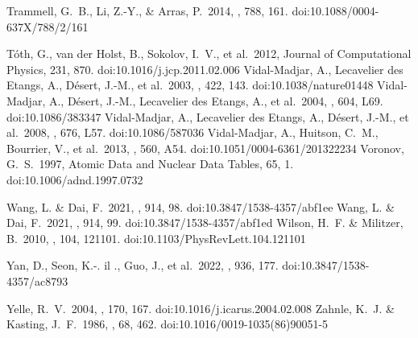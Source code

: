 \documentclass[journal, onecolumn]{aastex631}
\begin{document}
\begin{CJK*}{UTF8}{gbsn}
\begin{thebibliography}{99}
 Trammell, G.~B., Li, Z.-Y., \& Arras, P.\ 2014, \apj, 788, 161. doi:10.1088/0004-637X/788/2/161

 T{\'o}th, G., van der Holst, B., Sokolov, I.~V., et al.\ 2012, Journal of Computational Physics, 231, 870. doi:10.1016/j.jcp.2011.02.006
 Vidal-Madjar, A., Lecavelier des Etangs, A., D{\'e}sert, J.-M., et al.\ 2003, \nat, 422, 143. doi:10.1038/nature01448
 Vidal-Madjar, A., D{\'e}sert, J.-M., Lecavelier des Etangs, A., et al.\ 2004, \apjl, 604, L69. doi:10.1086/383347
 Vidal-Madjar, A., Lecavelier des Etangs, A., D{\'e}sert, J.-M., et al.\ 2008, \apjl, 676, L57. doi:10.1086/587036
 Vidal-Madjar, A., Huitson, C.~M., Bourrier, V., et al.\ 2013, \aap, 560, A54. doi:10.1051/0004-6361/201322234
 Voronov, G.~S.\ 1997, Atomic Data and Nuclear Data Tables, 65, 1. doi:10.1006/adnd.1997.0732



 Wang, L. \& Dai, F.\ 2021, \apj, 914, 98. doi:10.3847/1538-4357/abf1ee
 Wang, L. \& Dai, F.\ 2021, \apj, 914, 99. doi:10.3847/1538-4357/abf1ed
 Wilson, H.~F. \& Militzer, B.\ 2010, \prl, 104, 121101. doi:10.1103/PhysRevLett.104.121101

 Yan, D., Seon, K.-. il ., Guo, J., et al.\ 2022, \apj, 936, 177. doi:10.3847/1538-4357/ac8793


 Yelle, R.~V.\ 2004, \icarus, 170, 167. doi:10.1016/j.icarus.2004.02.008
 Zahnle, K.~J. \& Kasting, J.~F.\ 1986, \icarus, 68, 462. doi:10.1016/0019-1035(86)90051-5

\end{thebibliography}




\end{CJK*}
\end{document}
